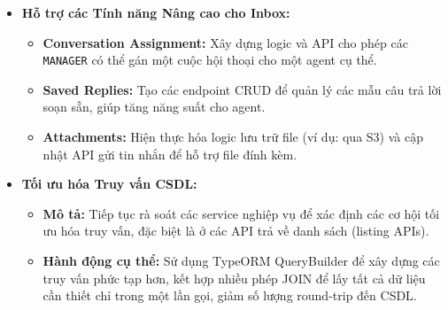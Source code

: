 \begin{itemize}
    \item \textbf{Hỗ trợ các Tính năng Nâng cao cho Inbox:}
    \begin{itemize}
        \item \textbf{Conversation Assignment:} Xây dựng logic và API cho phép các \texttt{MANAGER} có thể gán một cuộc hội thoại cho một agent cụ thể.
        \item \textbf{Saved Replies:} Tạo các endpoint CRUD để quản lý các mẫu câu trả lời soạn sẵn, giúp tăng năng suất cho agent.
        \item \textbf{Attachments:} Hiện thực hóa logic lưu trữ file (ví dụ: qua S3) và cập nhật API gửi tin nhắn để hỗ trợ file đính kèm.
    \end{itemize}
    
    \item \textbf{Tối ưu hóa Truy vấn CSDL:}
    \begin{itemize}
        \item \textbf{Mô tả:} Tiếp tục rà soát các service nghiệp vụ để xác định các cơ hội tối ưu hóa truy vấn, đặc biệt là ở các API trả về danh sách (listing APIs).
        \item \textbf{Hành động cụ thể:} Sử dụng TypeORM QueryBuilder để xây dựng các truy vấn phức tạp hơn, kết hợp nhiều phép JOIN để lấy tất cả dữ liệu cần thiết chỉ trong một lần gọi, giảm số lượng round-trip đến CSDL.
    \end{itemize}
\end{itemize}